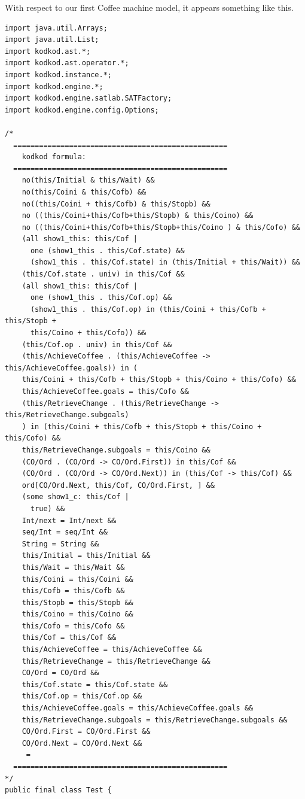 \documentclass[a4paper,12pt]{report}
\begin{document}
With respect to our first Coffee machine model, it appears something like this.
\begin{verbatim}
import java.util.Arrays;
import java.util.List;
import kodkod.ast.*;
import kodkod.ast.operator.*;
import kodkod.instance.*;
import kodkod.engine.*;
import kodkod.engine.satlab.SATFactory;
import kodkod.engine.config.Options;

/* 
  ==================================================
    kodkod formula: 
  ==================================================
    no(this/Initial & this/Wait) && 
    no(this/Coini & this/Cofb) && 
    no((this/Coini + this/Cofb) & this/Stopb) && 
    no ((this/Coini+this/Cofb+this/Stopb) & this/Coino) && 
    no ((this/Coini+this/Cofb+this/Stopb+this/Coino ) & this/Cofo) && 
    (all show1_this: this/Cof | 
      one (show1_this . this/Cof.state) && 
      (show1_this . this/Cof.state) in (this/Initial + this/Wait)) && 
    (this/Cof.state . univ) in this/Cof && 
    (all show1_this: this/Cof | 
      one (show1_this . this/Cof.op) && 
      (show1_this . this/Cof.op) in (this/Coini + this/Cofb + this/Stopb + 
      this/Coino + this/Cofo)) && 
    (this/Cof.op . univ) in this/Cof && 
    (this/AchieveCoffee . (this/AchieveCoffee -> this/AchieveCoffee.goals)) in (
    this/Coini + this/Cofb + this/Stopb + this/Coino + this/Cofo) && 
    this/AchieveCoffee.goals = this/Cofo && 
    (this/RetrieveChange . (this/RetrieveChange -> this/RetrieveChange.subgoals)
    ) in (this/Coini + this/Cofb + this/Stopb + this/Coino + this/Cofo) && 
    this/RetrieveChange.subgoals = this/Coino && 
    (CO/Ord . (CO/Ord -> CO/Ord.First)) in this/Cof && 
    (CO/Ord . (CO/Ord -> CO/Ord.Next)) in (this/Cof -> this/Cof) && 
    ord[CO/Ord.Next, this/Cof, CO/Ord.First, ] && 
    (some show1_c: this/Cof | 
      true) && 
    Int/next = Int/next && 
    seq/Int = seq/Int && 
    String = String && 
    this/Initial = this/Initial && 
    this/Wait = this/Wait && 
    this/Coini = this/Coini && 
    this/Cofb = this/Cofb && 
    this/Stopb = this/Stopb && 
    this/Coino = this/Coino && 
    this/Cofo = this/Cofo && 
    this/Cof = this/Cof && 
    this/AchieveCoffee = this/AchieveCoffee && 
    this/RetrieveChange = this/RetrieveChange && 
    CO/Ord = CO/Ord && 
    this/Cof.state = this/Cof.state && 
    this/Cof.op = this/Cof.op && 
    this/AchieveCoffee.goals = this/AchieveCoffee.goals && 
    this/RetrieveChange.subgoals = this/RetrieveChange.subgoals && 
    CO/Ord.First = CO/Ord.First && 
    CO/Ord.Next = CO/Ord.Next && 
     = 
  ==================================================
*/
public final class Test {


\end{verbatim}
\end{document}
